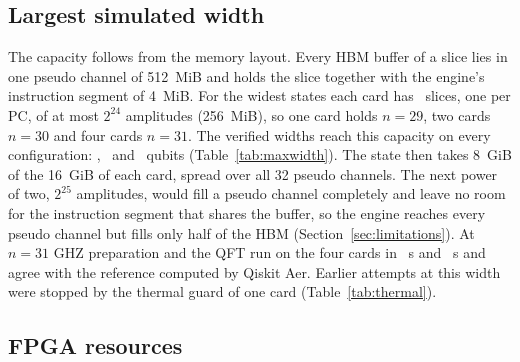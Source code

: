 \subsection{Largest simulated width}\label{subsec:res-maxwidth}

\begin{table}[t]
\caption{Largest width verified against the reference per number of cards and circuit, HBM occupied per card by the
state, end to end time (median of the timed repetitions; n/a for the single validation runs) and the largest amplitude
error.}\label{tab:maxwidth}

\end{table}

\begin{table}[t]
\caption{Instances stopped by the thermal guard (a card reached 90\,\textdegree C FPGA or 85\,\textdegree C HBM): setting of
the slice paths, completed repetitions, the card and its temperatures at the stop. The paths column gives F1, F2, F3 and
F4 in this order (1 on, 0 off, a: F4 chosen by the compiler, Section~\ref{subsec:compilation}).}\label{tab:thermal}

\end{table}

The capacity follows from the memory layout. Every HBM buffer of a slice lies in one pseudo channel of 512~MiB and
holds the slice together with the engine's instruction segment of 4~MiB. For the widest states each card has
\NumPcsUsedFlagship~slices, one per PC, of at most $2^{24}$ amplitudes (256~MiB), so one card holds $n=29$, two cards
$n=30$ and four cards $n=31$. The verified widths reach this capacity on every configuration: \NumMaxWidthOneCard,
\NumMaxWidthTwoCards~and \NumMaxWidthFourCards~qubits (Table~\ref{tab:maxwidth}). The state then takes 8~GiB of the
16~GiB of each card, spread over all 32 pseudo channels. The next power of two, $2^{25}$ amplitudes, would fill a pseudo
channel completely and leave no room for the instruction segment that shares the buffer, so the engine reaches every
pseudo channel but fills only half of the HBM (Section~\ref{sec:limitations}). At $n=31$ GHZ
preparation and the QFT run on the four cards in \NumMaxThirtyOneGhzS~s and \NumMaxThirtyOneQftS~s and agree with the
reference computed by Qiskit Aer. Earlier attempts at this width were stopped by the thermal guard of one card
(Table~\ref{tab:thermal}).

\subsection{FPGA resources}\label{subsec:res-resources}

